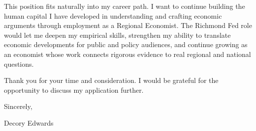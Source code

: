 \documentclass[11pt]{article}
\begin{document}
This position fits naturally into my career path. I want to continue building the human capital I have developed in understanding and crafting economic arguments through employment as a Regional Economist. The Richmond Fed role would let me deepen my empirical skills, strengthen my ability to translate economic developments for public and policy audiences, and continue growing as an economist whose work connects rigorous evidence to real regional and national questions.

Thank you for your time and consideration. I would be grateful for the opportunity to discuss my application further.

Sincerely,

\vspace{1em}

Decory Edwards
\end{document}
